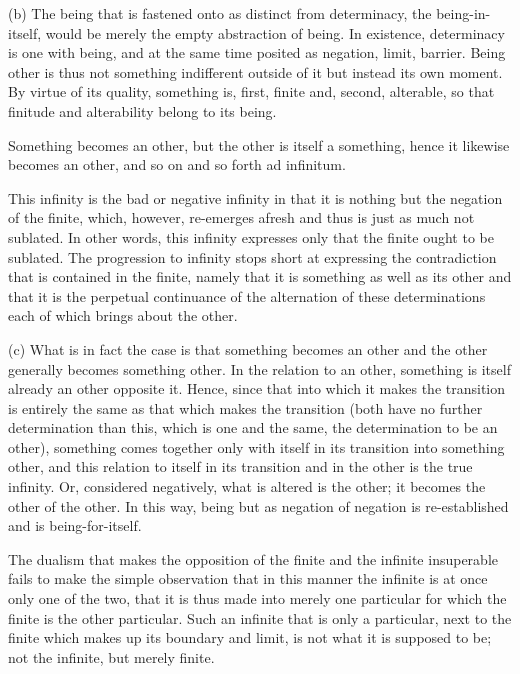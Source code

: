 (b) The being that is fastened onto as distinct from determinacy,
the being-in-itself, would be merely the empty abstraction of being.
In existence, determinacy is one with being, and
at the same time posited as negation, limit, barrier.
Being other is thus not something indifferent outside of it
but instead its own moment.
By virtue of its quality, something is,
first, finite and, second, alterable,
so that finitude and alterability belong to its being.

Something becomes an other,
but the other is itself a something,
hence it likewise becomes an other,
and so on and so forth ad infinitum.

This infinity is the bad or negative infinity in that
it is nothing but the negation of the finite, which, however,
re-emerges afresh and thus is just as much not sublated.
In other words, this infinity expresses only that
the finite ought to be sublated.
The progression to infinity stops short at expressing
the contradiction that is contained in the finite,
namely that it is something as well as its other and
that it is the perpetual continuance of the alternation
of these determinations each of which brings about the other.

(c) What is in fact the case is that something becomes an other
and the other generally becomes something other.
In the relation to an other,
something is itself already an other opposite it.
Hence, since that into which it makes the transition is
entirely the same as that which makes the transition
(both have no further determination than this,
which is one and the same, the determination to be an other),
something comes together only with itself
in its transition into something other, and
this relation to itself in its transition and
in the other is the true infinity.
Or, considered negatively, what is altered is the other;
it becomes the other of the other.
In this way, being but as negation of negation is
re-established and is being-for-itself.

    The dualism that makes the opposition of the finite and the infinite
    insuperable fails to make the simple observation that in this manner
    the infinite is at once only one of the two, that it is thus made into
    merely one particular for which the finite is the other particular.
    Such an infinite that is only a particular, next to the finite which
    makes up its boundary and limit, is not what it is supposed to be;
    not the infinite, but merely finite.

